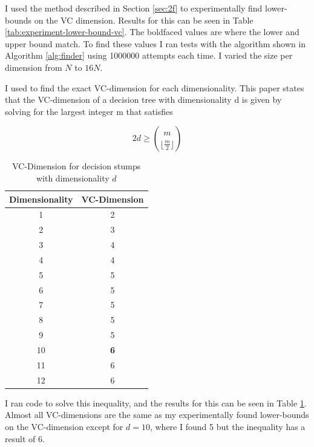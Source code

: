 \documentclass[11pt,a4paper]{article}
\begin{document}
I used the method described in Section \ref{sec:2f} to experimentally find lower-bounds on the VC dimension. Results for this can be seen in Table \ref{tab:experiment-lower-bound-vc}. The boldfaced values are where the lower and upper bound match. To find these values I ran tests with the algorithm shown in Algorithm \ref{alg:finder} using 1000000 attempts each time. I varied the size per dimension from $N$ to $16N$.

I used \cite{decicion-stump-vc-dimension} to find the exact VC-dimension for each dimensionality. This paper states that the VC-dimension of a decision tree with dimensionality d is given by solving for the largest integer m that satisfies

\[ 2d \geq {m \choose \lfloor\frac{m}{2}\rfloor} \]

\begin{table}
    \begin{tabular}{|c|c|}
    \hline
    Dimensionality & VC-Dimension \\ \hline
    1              & 2                        \\ \hline
    2              & 3                           \\ \hline
    3              & 4                         \\ \hline
    4              & 4                            \\ \hline
    5              & 5                            \\ \hline
    6              &    5                         \\ \hline
    7              & 5                           \\ \hline
    8              & 5                            \\ \hline
    9              & 5                            \\ \hline
    10              & \textbf{6}                            \\ \hline
    11             &  6                          \\ \hline
    12              &  6                           \\ \hline
    \end{tabular}
    \caption{VC-Dimension for decision stumps with dimensionality $d$}
    \label{tab:vc-dimension}
\end{table}

I ran code to solve this inequality, and the results for this can be seen in Table \ref{tab:vc-dimension}. Almost all VC-dimensions are the same as my experimentally found lower-bounds on the VC-dimension except for $d=10$, where I found 5 but the inequality has a result of 6.





\end{document}
